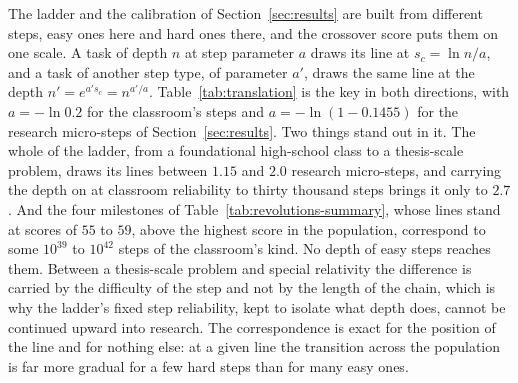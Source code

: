 \documentclass{article}
\begin{document}

The ladder and the calibration of Section~\ref{sec:results} are built from different steps, easy ones here and hard ones there, and the crossover score puts them on one scale. A task of depth $n$ at step parameter $a$ draws its line at $s_c = \ln n / a$, and a task of another step type, of parameter $a'$, draws the same line at the depth $n' = e^{a' s_c} = n^{a'/a}$. Table~\ref{tab:translation} is the key in both directions, with $a = -\ln 0.2$ for the classroom's steps and $a = -\ln(1 - 0.1455)$ for the research micro-steps of Section~\ref{sec:results}. Two things stand out in it. The whole of the ladder, from a foundational high-school class to a thesis-scale problem, draws its lines between $1.15$ and $2.0$ research micro-steps, and carrying the depth on at classroom reliability to thirty thousand steps brings it only to $2.7$. And the four milestones of Table~\ref{tab:revolutions-summary}, whose lines stand at scores of $55$ to $59$, above the highest score in the population, correspond to some $10^{39}$ to $10^{42}$ steps of the classroom's kind. No depth of easy steps reaches them. Between a thesis-scale problem and special relativity the difference is carried by the difficulty of the step and not by the length of the chain, which is why the ladder's fixed step reliability, kept to isolate what depth does, cannot be continued upward into research. The correspondence is exact for the position of the line and for nothing else: at a given line the transition across the population is far more gradual for a few hard steps than for many easy ones.
\end{document}
